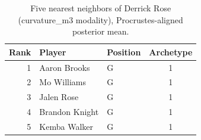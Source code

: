 \begin{table}[htbp]
  \centering\small
  \begin{tabular}{rllc}
    \toprule
    Rank & Player & Position & Archetype \\
    \midrule
    1 & Aaron Brooks & G & 1 \\
    2 & Mo Williams & G & 1 \\
    3 & Jalen Rose & G & 1 \\
    4 & Brandon Knight & G & 1 \\
    5 & Kemba Walker & G & 1 \\
    \bottomrule
  \end{tabular}
  \caption{Five nearest neighbors of Derrick Rose (curvature_m3 modality), Procrustes-aligned posterior mean.}
  \label{tab:Derrick_Rose_neighbors_curvature_m3}
\end{table}

